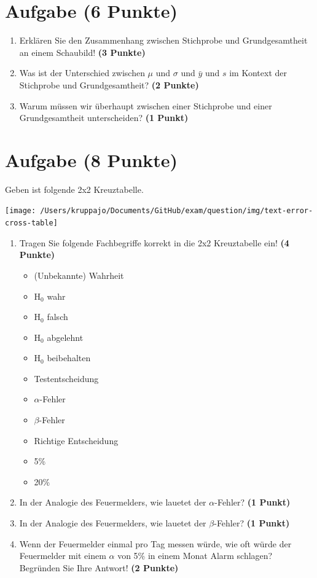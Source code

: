 \documentclass[a4paper, 10pt]{scrartcl}\usepackage[]{graphicx}\usepackage[]{xcolor}
\begin{document}
\section{Aufgabe \hfill (6 Punkte)}

\begin{enumerate}
\item Erkl{\"a}ren Sie den Zusammenhang zwischen Stichprobe und Grundgesamtheit
  an einem Schaubild! \textbf{(3 Punkte)}
\item Was ist der Unterschied zwischen $\mu$ und $\sigma$ und $\bar{y}$ und
  $s$ im Kontext der Stichprobe und Grundgesamtheit? \textbf{(2 Punkte)}
\item Warum m{\"u}ssen wir {\"u}berhaupt zwischen einer Stichprobe und einer
  Grundgesamtheit unterscheiden? \textbf{(1 Punkt)}
\end{enumerate} 
\clearpage

\section{Aufgabe \hfill (8 Punkte)}



Geben ist folgende 2x2 Kreuztabelle. 

\begin{center}
  \texttt{[image: /Users/kruppajo/Documents/GitHub/exam/question/img/text-error-cross-table]}
\end{center}

\begin{enumerate}
\item Tragen Sie folgende Fachbegriffe korrekt in die 2x2 Kreuztabelle ein! \textbf{(4 Punkte)}
  \begin{itemize}
  \item (Unbekannte) Wahrheit	
  \item H$_0$ wahr
  \item H$_0$ falsch
  \item H$_0$ abgelehnt
  \item H$_0$ beibehalten
  \item Testentscheidung
  \item $\alpha$-Fehler
  \item $\beta$-Fehler
  \item Richtige Entscheidung
  \item 5\%
  \item 20\%
  \end{itemize}
\item In der Analogie des Feuermelders, wie lauetet der $\alpha$-Fehler? \textbf{(1 Punkt)}
\item In der Analogie des Feuermelders, wie lauetet der $\beta$-Fehler? \textbf{(1 Punkt)}
\item Wenn der Feuermelder einmal pro Tag messen w{\"u}rde, wie oft w{\"u}rde der
  Feuermelder mit einem $\alpha$ von 5\% in einem Monat Alarm schlagen?
  Begr{\"u}nden Sie Ihre Antwort! \textbf{(2 Punkte)}
\end{enumerate}
\end{document}
